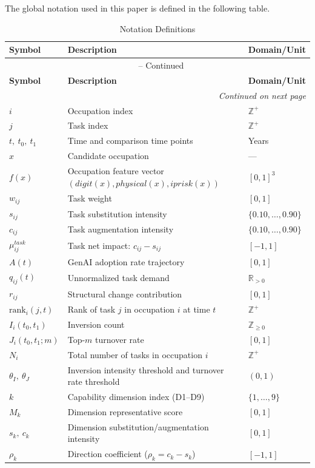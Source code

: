 The global notation used in this paper is defined in the following table.

{\small
\setlength{\tabcolsep}{4pt}
\renewcommand{\arraystretch}{1.2}
\begin{longtable}{@{} l >{\raggedright\arraybackslash}p{} l @{}}
\caption{Notation Definitions} \label{tab:notation_unified} \\
\toprule
\textbf{Symbol} & \textbf{Description} & \textbf{Domain/Unit} \\
\midrule
\endfirsthead
\multicolumn{3}{c}{\tablename\ \thetable{} -- Continued} \\
\toprule
\textbf{Symbol} & \textbf{Description} & \textbf{Domain/Unit} \\
\midrule
\endhead
\midrule
\multicolumn{3}{r}{\textit{Continued on next page}} \\
\endfoot
\bottomrule
\endlastfoot

$i$ & Occupation index & $\mathbb{Z}^+$ \\
$j$ & Task index & $\mathbb{Z}^+$ \\
$t,\ t_0,\ t_1$ & Time and comparison time points & Years \\
$x$ & Candidate occupation & --- \\
$f(x)$ & Occupation feature vector $(digit(x), physical(x), iprisk(x))$ & $[0,1]^3$ \\

$w_{ij}$ & Task weight & $[0,1]$ \\
$s_{ij}$ & Task substitution intensity & $\{0.10,\ldots,0.90\}$ \\
$c_{ij}$ & Task augmentation intensity & $\{0.10,\ldots,0.90\}$ \\

$\mu^{task}_{ij}$ & Task net impact: $c_{ij}-s_{ij}$ & $[-1,1]$ \\
$A(t)$ & GenAI adoption rate trajectory & $[0,1]$ \\
$q_{ij}(t)$ & Unnormalized task demand & $\mathbb{R}_{>0}$ \\
$r_{ij}$ & Structural change contribution & $[0,1]$ \\

$\mathrm{rank}_i(j,t)$ & Rank of task $j$ in occupation $i$ at time $t$ & $\mathbb{Z}^+$ \\
$I_i(t_0,t_1)$ & Inversion count & $\mathbb{Z}_{\ge 0}$ \\

$J_i(t_0,t_1;m)$ & Top-$m$ turnover rate & $[0,1]$ \\
$N_i$ & Total number of tasks in occupation $i$ & $\mathbb{Z}^+$ \\
$\theta_I,\ \theta_J$ & Inversion intensity threshold and turnover rate threshold & $(0,1)$ \\
$k$ & Capability dimension index (D1--D9) & $\{1,\ldots,9\}$ \\
$M_k$ & Dimension representative score & $[0,1]$ \\
$s_k,\ c_k$ & Dimension substitution/augmentation intensity & $[0,1]$ \\
$\rho_k$ & Direction coefficient ($\rho_k=c_k-s_k$) & $[-1,1]$ \\

\end{longtable}
}
